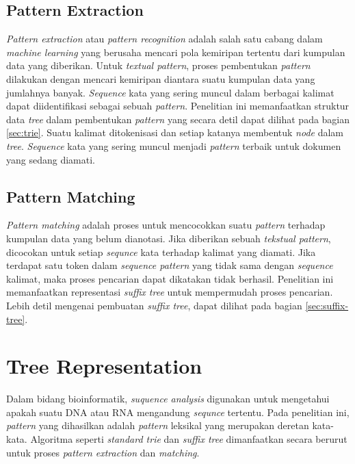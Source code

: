\subsection{Pattern Extraction}
\textit{Pattern extraction} atau \textit{pattern recognition} adalah salah satu cabang dalam \textit{machine learning} yang berusaha mencari pola kemiripan tertentu dari kumpulan data yang diberikan. Untuk \textit{textual pattern}, proses pembentukan \textit{pattern} dilakukan dengan mencari kemiripan diantara suatu kumpulan data yang jumlahnya banyak. \textit{Sequence} kata yang sering muncul dalam berbagai kalimat dapat diidentifikasi sebagai sebuah \textit{pattern}. Penelitian ini memanfaatkan struktur data \textit{tree} dalam pembentukan \textit{pattern} yang secara detil dapat dilihat pada bagian \ref{sec:trie}. Suatu kalimat ditokenisasi dan setiap katanya membentuk \textit{node} dalam \textit{tree}. \textit{Sequence} kata yang sering muncul menjadi \textit{pattern} terbaik untuk dokumen yang sedang diamati.

\subsection{Pattern Matching}
\textit{Pattern matching} adalah proses untuk mencocokkan suatu \textit{pattern} terhadap kumpulan data yang belum dianotasi. Jika diberikan sebuah \textit{tekstual pattern}, dicocokan untuk setiap \textit{sequnce} kata terhadap kalimat yang diamati. Jika terdapat satu token dalam \textit{sequence pattern} yang tidak sama dengan \textit{sequence} kalimat, maka proses pencarian dapat dikatakan tidak berhasil. Penelitian ini memanfaatkan representasi \textit{suffix tree} untuk mempermudah proses pencarian. Lebih detil mengenai pembuatan \textit{suffix tree}, dapat dilihat pada bagian \ref{sec:suffix-tree}.


\section{Tree Representation} 
Dalam bidang bioinformatik, \textit{suquence analysis} digunakan untuk mengetahui apakah suatu DNA atau RNA mengandung \textit{sequnce} tertentu. Pada penelitian ini, \textit{pattern} yang dihasilkan adalah \textit{pattern} leksikal yang merupakan deretan kata-kata. Algoritma seperti \textit{standard trie} dan \textit{suffix tree} dimanfaatkan secara berurut untuk proses \textit{pattern extraction} dan \textit{matching}.

